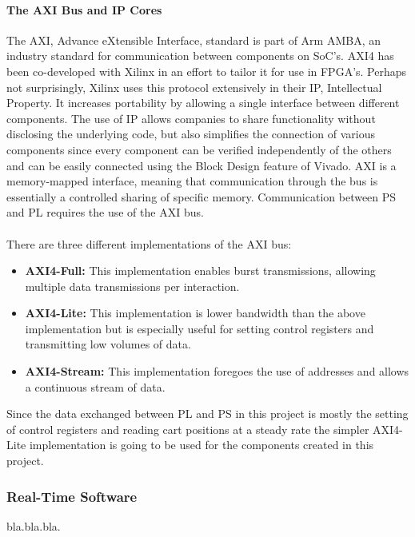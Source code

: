 \paragraph{The AXI Bus and IP Cores} %
\label{par:the_axi_bus}
The AXI, Advance eXtensible Interface, standard is part of Arm AMBA, an industry standard for communication between components on SoC's.
AXI4 has been co-developed with Xilinx in an effort to tailor it for use in FPGA's.
Perhaps not surprisingly, Xilinx uses this protocol extensively in their IP, Intellectual Property.
It increases portability by allowing a single interface between different components.
The use of IP allows companies to share functionality without disclosing the underlying code, but also simplifies the connection of various components since every component can be verified independently of the others and can be easily connected using the Block Design feature of Vivado.
AXI is a memory-mapped interface, meaning that communication through the bus is essentially a controlled sharing of specific memory.
Communication between PS and PL requires the use of the AXI bus.
\\~\\
There are three different implementations of the AXI bus:
\begin{itemize}
	\item \textbf{AXI4-Full:} This implementation enables burst transmissions, allowing multiple data transmissions per interaction.
	\item \textbf{AXI4-Lite:} This implementation is lower bandwidth than the above implementation but is especially useful for setting control registers and transmitting low volumes of data.
	\item \textbf{AXI4-Stream:} This implementation foregoes the use of addresses and allows a continuous stream of data.
\end{itemize}
Since the data exchanged between PL and PS in this project is mostly the setting of control registers and reading cart positions at a steady rate the simpler AXI4-Lite implementation is going to be used for the components created in this project.
\subsubsection{Real-Time Software} %
\label{ssub:real_time}
bla.bla.bla.

